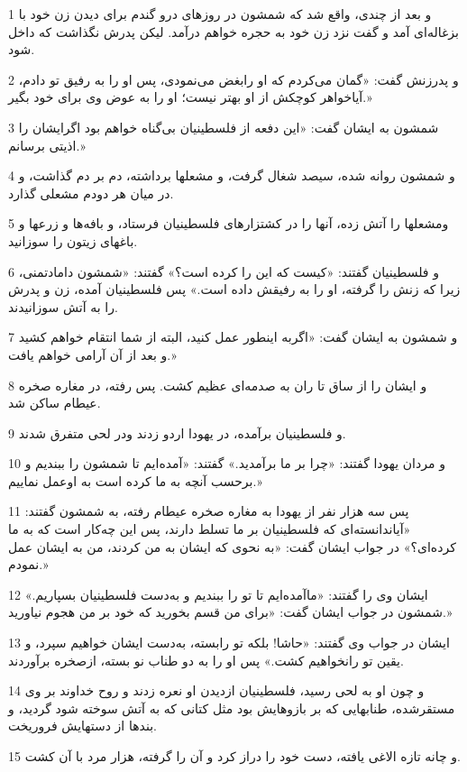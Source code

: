 \par 1 و بعد از چندی، واقع شد که شمشون در روزهای درو گندم برای دیدن زن خود با بزغاله‌ای آمد و گفت نزد زن خود به حجره خواهم درآمد. لیکن پدرش نگذاشت که داخل شود.
\par 2 و پدرزنش گفت: «گمان می‌کردم که او رابغض می‌نمودی، پس او را به رفیق تو دادم، آیاخواهر کوچکش از او بهتر نیست؛ او را به عوض وی برای خود بگیر.»
\par 3 شمشون به ایشان گفت: «این دفعه از فلسطینیان بی‌گناه خواهم بود اگرایشان را اذیتی برسانم.»
\par 4 و شمشون روانه شده، سیصد شغال گرفت، و مشعلها برداشته، دم بر دم گذاشت، و در میان هر دو‌دم مشعلی گذارد.
\par 5 ومشعلها را آتش زده، آنها را در کشتزارهای فلسطینیان فرستاد، و بافه‌ها و زرعها و باغهای زیتون را سوزانید.
\par 6 و فلسطینیان گفتند: «کیست که این را کرده است؟» گفتند: «شمشون دامادتمنی، زیرا که زنش را گرفته، او را به رفیقش داده است.» پس فلسطینیان آمده، زن و پدرش را به آتش سوزانیدند.
\par 7 و شمشون به ایشان گفت: «اگربه اینطور عمل کنید، البته از شما انتقام خواهم کشید و بعد از آن آرامی خواهم یافت.»
\par 8 و ایشان را از ساق تا ران به صدمه‌ای عظیم کشت. پس رفته، در مغاره صخره عیطام ساکن شد.
\par 9 و فلسطینیان برآمده، در یهودا اردو زدند ودر لحی متفرق شدند.
\par 10 و مردان یهودا گفتند: «چرا بر ما برآمدید.» گفتند: «آمده‌ایم تا شمشون را ببندیم و برحسب آنچه به ما کرده است به اوعمل نماییم.»
\par 11 پس سه هزار نفر از یهودا به مغاره صخره عیطام رفته، به شمشون گفتند: «آیاندانسته‌ای که فلسطینیان بر ما تسلط دارند، پس این چه‌کار است که به ما کرده‌ای؟» در جواب ایشان گفت: «به نحوی که ایشان به من کردند، من به ایشان عمل نمودم.»
\par 12 ایشان وی را گفتند: «ماآمده‌ایم تا تو را ببندیم و به‌دست فلسطینیان بسپاریم.» شمشون در جواب ایشان گفت: «برای من قسم بخورید که خود بر من هجوم نیاورید.»
\par 13 ایشان در جواب وی گفتند: «حاشا! بلکه تو رابسته، به‌دست ایشان خواهیم سپرد، و یقین تو رانخواهیم کشت.» پس او را به دو طناب نو بسته، ازصخره برآوردند.
\par 14 و چون او به لحی رسید، فلسطینیان ازدیدن او نعره زدند و روح خداوند بر وی مستقرشده، طنابهایی که بر بازوهایش بود مثل کتانی که به آتش سوخته شود گردید، و بندها از دستهایش فروریخت.
\par 15 و چانه تازه الاغی یافته، دست خود را دراز کرد و آن را گرفته، هزار مرد با آن کشت.
